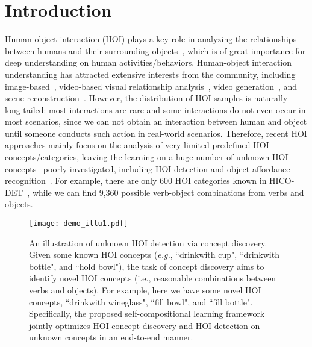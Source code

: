 \documentclass[runningheads]{llncs}
\newcommand{\eg}{\textit{e.g.}}
\begin{document}
\section{Introduction}
\label{sec:intro}


Human-object interaction (HOI) plays a key role in analyzing the relationships between humans and their surrounding objects~\cite{gupta2009observing}, which is of great importance for deep understanding on human activities/behaviors. Human-object interaction understanding has attracted extensive interests from the community, including image-based~\cite{chaoy2015hico,chaoy2018learning,gao2018ican,liao2019ppdm,tamura_cvpr2021}, video-based visual relationship analysis~\cite{damen2018scaling1,materzynska2020something}, video generation~\cite{nawhal2020generating}, and  scene reconstruction~\cite{zhang2020phosa}. However, the distribution of HOI samples is naturally long-tailed: most interactions are rare and some interactions do not even occur in most scenarios, since we can not obtain an interaction between human and object until someone conducts such action in real-world scenarios. Therefore, recent HOI approaches mainly focus on the analysis of very limited predefined HOI concepts/categories, leaving the learning on a huge number of unknown HOI concepts~\cite{coren2003sensation,best1986cognitive}  poorly investigated, including HOI detection and object affordance recognition~\cite{shen2018scaling,hou2020visual,hou2021atl}. For example, there are only 600 HOI categories known in HICO-DET~\cite{chao2018learning}, while we can find 9,360 possible verb-object combinations from  verbs and  objects.


\begin{figure}
  \centering
  \texttt{[image: demo\_illu1.pdf]}
  \caption{An illustration of unknown HOI detection via  concept discovery. Given some known HOI concepts (\eg, ``drinkwith cup", ``drinkwith bottle", and ``hold bowl"), the task of concept discovery aims to identify novel HOI concepts (i.e., reasonable combinations between verbs and objects). For example, here we have some novel HOI concepts, ``drinkwith wineglass", ``fill bowl", and ``fill bottle". Specifically, the proposed self-compositional learning framework jointly optimizes HOI concept discovery and HOI detection on unknown concepts in an end-to-end manner.
  }
  \label{fig:concpet}
\end{figure}
\end{document}
